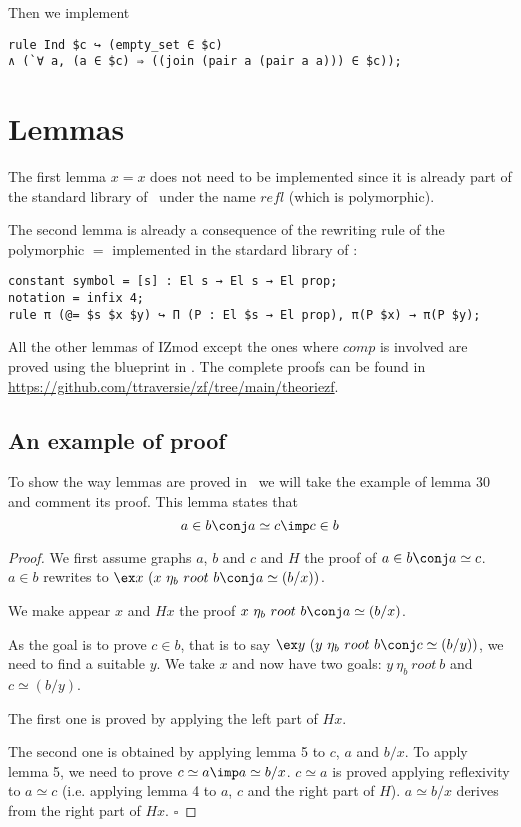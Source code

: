 \documentclass[a4paper]{article}
\begin{document}
Then we implement

\begin{lstlisting}
rule Ind $c ↪ (empty_set ∈ $c) 
∧ (`∀ a, (a ∈ $c) ⇒ ((join (pair a (pair a a))) ∈ $c));
\end{lstlisting}


\section{Lemmas}

The first lemma $x=x$ does not need to be implemented since it is already part of the standard library of \dedukti \ under the name $refl$ (which is polymorphic).

The second lemma is already a consequence of the rewriting rule of the polymorphic $=$ implemented in the stardard library of \dedukti: 
\begin{lstlisting}
constant symbol = [s] : El s → El s → El prop;
notation = infix 4;
rule π (@= $s $x $y) ↪ Π (P : El $s → El prop), π(P $x) → π(P $y);
\end{lstlisting}

All the other lemmas of IZmod except the ones where $comp$ is involved are proved using the blueprint in \cite{zermodulo53}. The complete proofs can be found in \url{https://github.com/ttraversie/zf/tree/main/theoriezf}.

\subsection{An example of proof}

To show the way lemmas are proved in \dedukti ~we will take the example of lemma 30 and comment its proof. This lemma states that $$ a \in b \conj a \simeq c \imp c \in b $$

\begin{proof}
We first assume graphs $a$, $b$ and $c$ and $H$ the proof of $ a \in b \conj a \simeq c $. $a \in b$ rewrites to $\ex x~(x~\eta_b~root~b \conj a \simeq (b/x))$. 

We make appear $x$ and $Hx$ the proof $x~\eta_b~root~b \conj a \simeq (b/x)$. 

As the goal is to prove $c \in b$, that is to say $\ex y~(y~\eta_b~root~b \conj c \simeq (b/y))$, we need to find a suitable $y$. We take $x$ and now have two goals: $y~\eta_b~root~b$ and $c \simeq (b/y)$. 

The first one is proved by applying the left part of $Hx$. 

The second one is obtained by applying lemma 5 to $c$, $a$ and $b/x$. To apply lemma 5, we need to prove $c \simeq a \imp a \simeq b/x$. $c \simeq a$ is proved applying reflexivity to $a \simeq c$ (i.e. applying lemma 4 to $a$, $c$ and the right part of $H$). $a \simeq b/x$ derives from the right part of $Hx$. $\square$
\end{proof}
\end{document}
